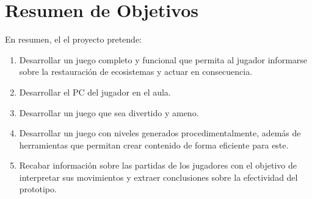 \section{Resumen de Objetivos}

En resumen, el el proyecto pretende:
\begin{enumerate}
    \item Desarrollar un juego completo y funcional que permita al jugador informarse sobre la restauración de ecosistemas y actuar en consecuencia.
    \item Desarrollar el PC del jugador en el aula.
    \item Desarrollar un juego que sea divertido y ameno.
    \item Desarrollar un juego con niveles generados procedimentalmente, además de herramientas que permitan crear contenido de forma eficiente para este.
    \item Recabar información sobre las partidas de los jugadores con el objetivo de interpretar sus movimientos y extraer conclusiones sobre la efectividad del prototipo.
\end{enumerate}